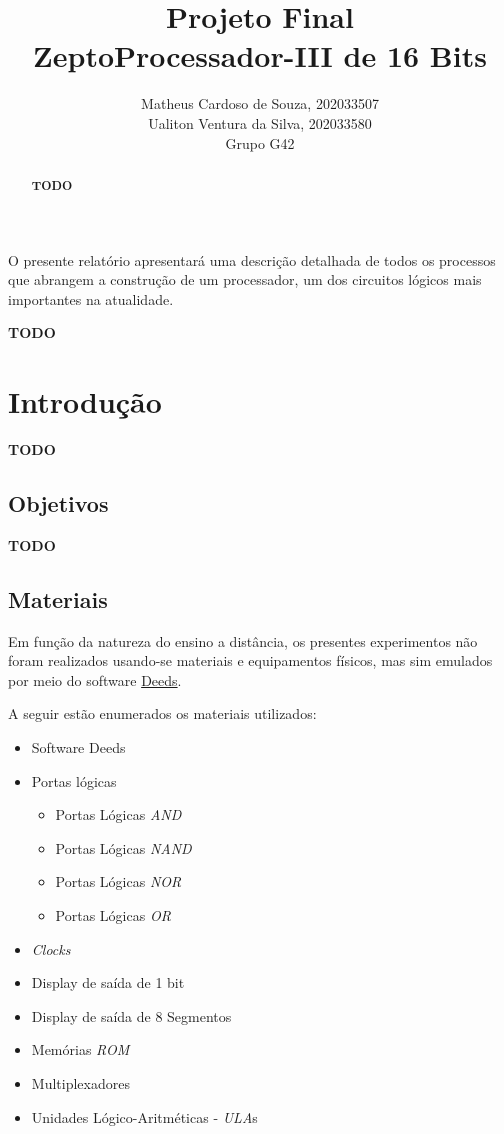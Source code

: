 \documentclass[12pt]{article}
\title{Projeto Final\\
ZeptoProcessador-III de 16 Bits}
\author{Matheus Cardoso de Souza, 202033507\\
        Ualiton Ventura da Silva, 202033580\\
        Grupo G42
}
\begin{document}
\maketitle

 \begin{abstract}
   \textbf{TODO}
 \end{abstract}

 \begin{resumo}
   O presente relatório apresentará uma descrição detalhada de todos os
   processos que abrangem a construção de um processador, um dos circuitos
   lógicos mais importantes na atualidade.

   \textbf{TODO}
 \end{resumo}


\section{Introdução}\label{sec:Introducao}

\textbf{TODO}

\subsection{Objetivos}\label{sec:Objetivos}

\textbf{TODO}

\subsection{Materiais}\label{sec:Materiais}

Em função da natureza do ensino a distância, os presentes experimentos não foram
realizados usando-se materiais e equipamentos físicos, mas sim emulados por meio
do software
\href{https://www.digitalelectronicsdeeds.com/downloads.html}{Deeds}.

A seguir estão enumerados os materiais utilizados:
\begin{itemize}
    \item Software Deeds
    \item Portas lógicas
    \begin{itemize}
      \item Portas Lógicas \emph{AND}
      \item Portas Lógicas \emph{NAND}
      \item Portas Lógicas \emph{NOR}
      \item Portas Lógicas \emph{OR}
    \end{itemize}
    \item \emph{Clocks}
    \item Display de saída de 1 bit
    \item Display de saída de 8 Segmentos
    \item Memórias \emph{ROM}
    \item Multiplexadores
    \item Unidades Lógico-Aritméticas - \emph{ULA}s
\end{itemize}
\end{document}
